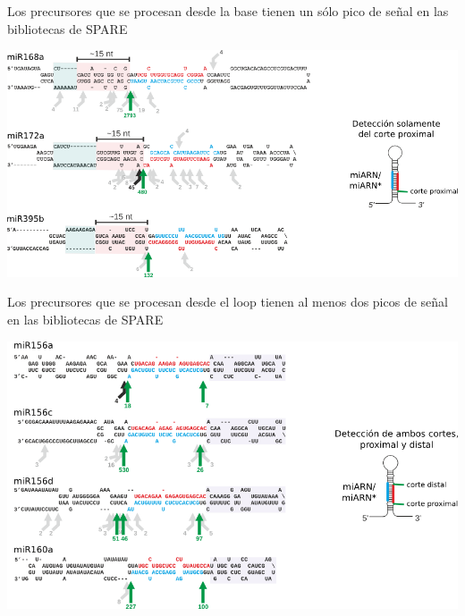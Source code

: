 \documentclass{beamer}
\begin{document}
\begin{frame}{Los precursores que se procesan desde la base tienen un sólo pico de señal en las bibliotecas de SPARE}
	\begin{center}
		\includegraphics[width=.8\textwidth]{img/GR_fig2A.png}
	\end{center}
\end{frame}

\begin{frame}{Los precursores que se procesan desde el loop tienen al menos dos picos de señal en las bibliotecas de SPARE}
	\begin{center}
		\includegraphics[width=.7\textwidth]{img/GR_fig4A.png}
	\end{center}
\end{frame}
\end{document}
